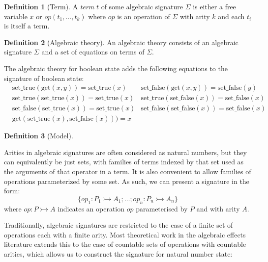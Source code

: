 \documentclass[acmsmall, screen, nonacm]{acmart}
\theoremstyle{definition}
\newtheorem{definition}{Definition}[section]
\newcommand{\types}{\mathrel{:}}
\begin{document}
\begin{definition}[Term]
  A \emph{term} $t$ of some algebraic signature $\Sigma$ is either a
  free variable $x$ or $op(t_1, \ldots, t_k)$ where $op$ is an operation
  of $\Sigma$ with arity $k$ and each $t_i$ is itself a term.
\end{definition}

\begin{definition}[Algebraic theory]
  An algebraic theory consists of an algebraic signature $\Sigma$ and a set of
  equations on terms of $\Sigma$.
\end{definition}

\begin{example}
  The algebraic theory for boolean state adds the following equations to
  the signature of boolean state:
  \begin{align*}
    &\mathrm{set\_true}(\mathrm{get}(x, y)) = \mathrm{set\_true}(x)
    &\mathrm{set\_false}(\mathrm{get}(x, y)) = \mathrm{set\_false}(y) \\
    &\mathrm{set\_true}(\mathrm{set\_true}(x)) = \mathrm{set\_true}(x)
    &\mathrm{set\_true}(\mathrm{set\_false}(x)) = \mathrm{set\_false}(x) \\
    &\mathrm{set\_false}(\mathrm{set\_true}(x)) = \mathrm{set\_true}(x)
    &\mathrm{set\_false}(\mathrm{set\_false}(x)) = \mathrm{set\_false}(x) \\
    &\mathrm{get}(\mathrm{set\_true}(x), \mathrm{set\_false}(x))) = x
  \end{align*}
\end{example}

\begin{definition}[Model]

\end{definition}

Arities in algebraic signatures are often considered as natural numbers,
but they can equivalently be just sets, with families of terms indexed
by that set used as the arguments of that operator in a term. It is also
convenient to allow families of operations parameterized by some set. As
such, we can present a signature in the form:
\begin{equation*}
\{ op_1 \types P_1 \rightarrowtail A_1; \ldots; op_n
\types P_n \rightarrowtail A_n \}
\end{equation*}
where $op \types P \rightarrowtail A$ indicates an operation $op$
parameterised by $P$ and with arity $A$.

Traditionally, algebraic signatures are restricted to the case of a
finite set of operations each with a finite arity. Most theoretical work
in the algebraic effects literature extends this to the case of
countable sets of operations with countable arities, which allows us to
construct the signature for natural number state:
\end{document}
